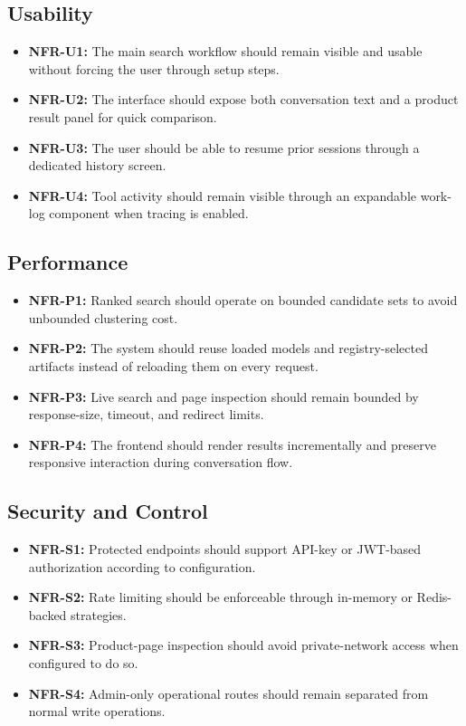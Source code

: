 \documentclass[12pt,a4paper,oneside]{report}
\begin{document}
\subsection{Usability}
\begin{itemize}[leftmargin=0.35in]
    \item \textbf{NFR-U1:} The main search workflow should remain visible and usable without forcing the user through setup steps.
    \item \textbf{NFR-U2:} The interface should expose both conversation text and a product result panel for quick comparison.
    \item \textbf{NFR-U3:} The user should be able to resume prior sessions through a dedicated history screen.
    \item \textbf{NFR-U4:} Tool activity should remain visible through an expandable work-log component when tracing is enabled.
\end{itemize}

\subsection{Performance}
\begin{itemize}[leftmargin=0.35in]
    \item \textbf{NFR-P1:} Ranked search should operate on bounded candidate sets to avoid unbounded clustering cost.
    \item \textbf{NFR-P2:} The system should reuse loaded models and registry-selected artifacts instead of reloading them on every request.
    \item \textbf{NFR-P3:} Live search and page inspection should remain bounded by response-size, timeout, and redirect limits.
    \item \textbf{NFR-P4:} The frontend should render results incrementally and preserve responsive interaction during conversation flow.
\end{itemize}

\subsection{Security and Control}
\begin{itemize}[leftmargin=0.35in]
    \item \textbf{NFR-S1:} Protected endpoints should support API-key or JWT-based authorization according to configuration.
    \item \textbf{NFR-S2:} Rate limiting should be enforceable through in-memory or Redis-backed strategies.
    \item \textbf{NFR-S3:} Product-page inspection should avoid private-network access when configured to do so.
    \item \textbf{NFR-S4:} Admin-only operational routes should remain separated from normal write operations.
\end{itemize}
\end{document}
